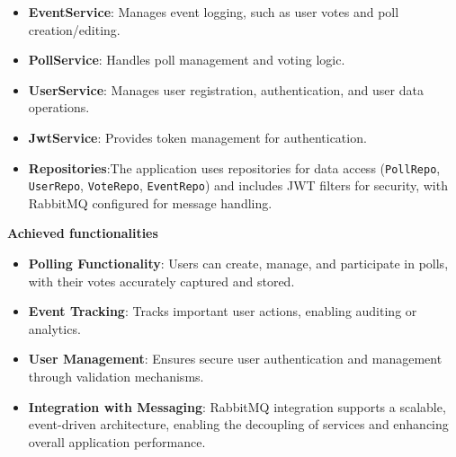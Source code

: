 \vspace{1cm}

\begin{itemize}
    \item \textbf{EventService}: Manages event logging, such as user votes and poll creation/editing.
    \item \textbf{PollService}: Handles poll management and voting logic.
    \item \textbf{UserService}: Manages user registration, authentication, and user data operations.
    \item \textbf{JwtService}: Provides token management for authentication.
    \item \textbf{Repositories}:The application uses repositories for data access (\texttt{PollRepo}, \texttt{UserRepo}, \texttt{VoteRepo}, \texttt{EventRepo}) and includes JWT filters for security, with RabbitMQ configured for message handling.
\end{itemize}

\vspace{0.5cm}

\textbf{Achieved functionalities}
\begin{itemize}
    \item \textbf{Polling Functionality}: Users can create, manage, and participate in polls, with their votes accurately captured and stored.
    \item \textbf{Event Tracking}: Tracks important user actions, enabling auditing or analytics.
    \item \textbf{User Management}: Ensures secure user authentication and management through validation mechanisms.
    \item \textbf{Integration with Messaging}: RabbitMQ integration supports a scalable, event-driven architecture, enabling the decoupling of services and enhancing overall application performance.
\end{itemize}


